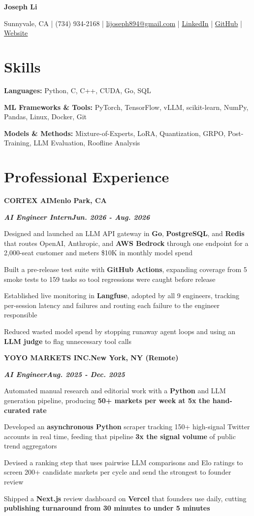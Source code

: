 \documentclass[10pt]{article}
\renewcommand{\resumeheader}[2]{%
  {\centering\fontsize{16}{18}\selectfont\bfseries #1\par}%
  \vspace{4pt}%
  {\centering\fontsize{10.5}{13}\selectfont #2\par}%
  \vspace{6pt}%
}
\renewcommand{\skill}[2]{\textbf{#1:} #2\par\vspace{1.5pt}}
\newcommand{\job}[4]{%
  \vspace{0pt}%
  \textbf{\MakeUppercase{#1}}\hfill\textbf{#2}\par
  \vspace{0.5pt}%
  \textbf{\textit{#3}}\hfill\textbf{\textit{#4}}\par
}
\begin{document}
\resumeheader{Joseph Li}{%
Sunnyvale, CA | (734) 934-2168 | \href{mailto:lijoseph894@gmail.com}{lijoseph894@gmail.com} | \href{https://www.linkedin.com/in/lijoseph894/}{\underline{LinkedIn}} | \href{https://github.com/josephl894}{\underline{GitHub}} | \href{https://josephl894.github.io}{\underline{Website}}}

\section{Skills}
\skill{Languages}{Python, C, C++, CUDA, Go, SQL}
\skill{ML Frameworks \& Tools}{PyTorch, TensorFlow, vLLM, scikit-learn, NumPy, Pandas, Linux, Docker, Git}
\skill{Models \& Methods}{Mixture-of-Experts, LoRA, Quantization, GRPO, Post-Training, LLM Evaluation, Roofline Analysis}

\section{Professional Experience}
\job{Cortex AI}{Menlo Park, CA}{AI Engineer Intern}{Jun. 2026 - Aug. 2026}
\begin{bullets}
  \item Designed and launched an LLM API gateway in \textbf{Go}, \textbf{PostgreSQL}, and \textbf{Redis} that routes OpenAI, Anthropic, and \textbf{AWS Bedrock} through one endpoint for a 2,000-seat customer and meters \$10K in monthly model spend
  \item Built a pre-release test suite with \textbf{GitHub Actions}, expanding coverage from 5 smoke tests to 159 tasks so tool regressions were caught before release
  \item Established live monitoring in \textbf{Langfuse}, adopted by all 9 engineers, tracking per-session latency and failures and routing each failure to the engineer responsible
  \item Reduced wasted model spend by stopping runaway agent loops and using an \textbf{LLM judge} to flag unnecessary tool calls
\end{bullets}

\vspace{3pt}
\job{Yoyo Markets Inc.}{New York, NY (Remote)}{AI Engineer}{Aug. 2025 - Dec. 2025}
\begin{bullets}
  \item Automated manual research and editorial work with a \textbf{Python} and LLM generation pipeline, producing \textbf{50+ markets per week at 5x the hand-curated rate}
  \item Developed an \textbf{asynchronous Python} scraper tracking 150+ high-signal Twitter accounts in real time, feeding that pipeline \textbf{3x the signal volume} of public trend aggregators
  \item Devised a ranking step that uses pairwise LLM comparisons and Elo ratings to screen 200+ candidate markets per cycle and send the strongest to founder review
  \item Shipped a \textbf{Next.js} review dashboard on \textbf{Vercel} that founders use daily, cutting \textbf{publishing turnaround from 30 minutes to under 5 minutes}
\end{bullets}
\end{document}
